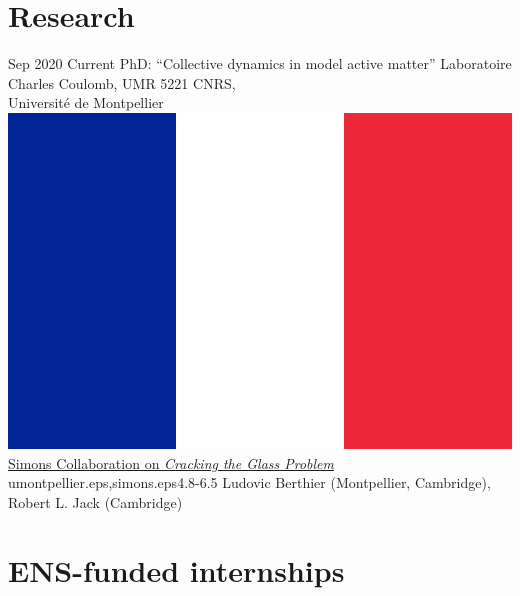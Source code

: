 \documentclass[letterpaper]{cvtemplate_en} %
\begin{document}
\makeprofile %


\vspace{3.25mm}
\section{Research}

\begin{cvbody}

\cvitem
	{Sep 2020}
	{Current}
  {PhD: ``Collective dynamics in model active matter''}
  {Laboratoire Charles Coulomb, UMR 5221 CNRS,\\ Universit\'e de Montpellier \includegraphics[height=0.8\myheight]{fr}\\
  \href{https://scglass.uchicago.edu}{Simons Collaboration on \textit{Cracking the Glass Problem}}}
  {umontpellier.eps,simons.eps}{4.8}{-6.5}
	{Ludovic Berthier (Montpellier, Cambridge),\\ Robert L. Jack (Cambridge)}
  {\\}

\end{cvbody}

\section{ENS-funded internships}
\end{document}

